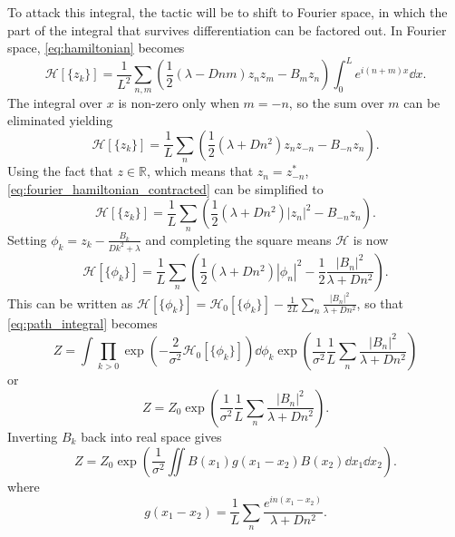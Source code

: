  To attack this integral, the tactic will be to shift to Fourier space, in which the part of the integral that survives differentiation can be factored out.
 In Fourier space, \cref{eq:hamiltonian} becomes
 \begin{equation}
   \label{eq:fourier_hamiltonian}
   \mathcal{H}[\{z_k\}] = \frac{1}{L^2}\sum_{n,m}\left(\frac{1}{2}\left(\lambda  - D nm\right) z_nz_m - B_mz_n\right)\int_0^L  e^{i(n+m)x}\dd{x}.
 \end{equation}
 The integral over $x$ is non-zero only when $m = -n$, so the sum over $m$ can be eliminated yielding
 \begin{equation}
   \label{eq:fourier_hamiltonian_contracted}
   \mathcal{H}[\{z_k\}] = \frac{1}{L}\sum_{n} \left(\frac{1}{2}\left(\lambda  + D n^2\right) z_nz_{-n} - B_{-n}z_{n}\right).
 \end{equation}
 Using the fact that $z \in \mathbb{R}$, which means that $z_n = z_{-n}^*$, \cref{eq:fourier_hamiltonian_contracted} can be simplified to
 \begin{equation}
   \label{eq:fourier_hamiltonian_contracted_mod}
   \mathcal{H}[\{z_k\}] = \frac{1}{L}\sum_{n} \left(\frac{1}{2}\left(\lambda  + D n^2\right) \left|z_n\right|^2- B_{-n}z_{n}\right).
 \end{equation}
 Setting $\phi_k = z_k - \frac{B_k}{Dk^2 + \lambda}$ and completing the square means $\mathcal{H}$ is now
 \begin{equation}
   \label{eq:fourier_phi}
   \mathcal{H}[\{\phi_k\}] =  \frac{1}{L}\sum_{n} \left(\frac{1}{2}\left(\lambda + Dn^2\right) \left|\phi_n\right|^2 - \frac{1}{2}\frac{\left|B_n\right|^2}{\lambda + Dn^2}\right).
 \end{equation}
 This can be written as $\mathcal{H}[\{\phi_k\}] = \mathcal{H}_0[\{\phi_k\}] - \frac{1}{2L}\sum_{n}\frac{\left|B_n\right|^2}{\lambda + Dn^2}$, so that \cref{eq:path_integral} becomes
 \begin{equation}
   \label{eq:path_integral_factored}
   Z = \int \prod_{k>0} \exp \left(-\frac{2}{\sigma^2} \mathcal{H}_0[\{\phi_k\}]\right) \dd{\phi_k}\exp\left(\frac{1}{\sigma^2} \frac{1}{L}\sum_{n}\frac{\left|B_n\right|^2}{\lambda + Dn^2}\right)
 \end{equation}
 or
 \begin{equation}
   \label{eq:path_integral_factored_Z0}
   Z = Z_0 \exp\left(\frac{1}{\sigma^2} \frac{1}{L}\sum_{n}\frac{\left|B_n\right|^2}{\lambda + Dn^2}\right).
 \end{equation}
 Inverting $B_k$ back into real space gives
 \begin{equation}
   \label{eq:path_integral_factored_Z0_real}
   Z = Z_0 \exp\left(\frac{1}{\sigma^2} \iint B(x_1) g(x_1 - x_2) B(x_2) \dd{x_1}\dd{x_2}\right).
 \end{equation}
 where
 \begin{equation}
   \label{eq:G_from_Z}
   g(x_1 - x_2) =  \frac{1}{L}\sum_{n} \frac{e^{in(x_1-x_2)}}{\lambda + Dn^2}. 
 \end{equation}
 
